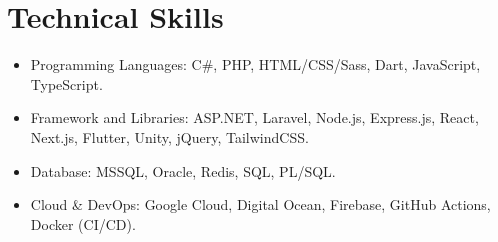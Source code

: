 \section{Technical Skills}

\begin{itemize}[itemsep=1pt, parsep=0pt, topsep=0pt]
    \item Programming Languages: C\#, PHP, HTML/CSS/Sass, Dart, JavaScript, TypeScript.
    \item Framework and Libraries: ASP.NET, Laravel, Node.js, Express.js, React, Next.js, Flutter, Unity, jQuery, TailwindCSS.
    \item Database: MSSQL, Oracle, Redis, SQL, PL/SQL.
    \item Cloud \& DevOps: Google Cloud, Digital Ocean, Firebase, GitHub Actions, Docker (CI/CD).
\end{itemize}
